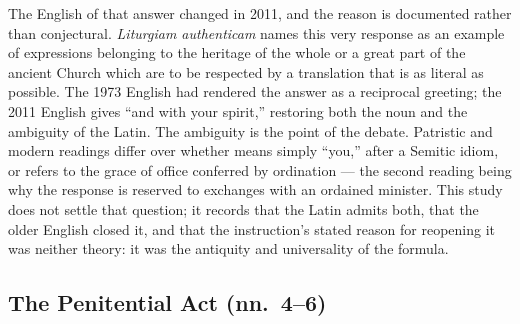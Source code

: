 The English of that answer changed in 2011, and the reason is documented rather than
conjectural. \emph{Liturgiam authenticam} names this very response as an example of expressions
belonging to the heritage of the whole or a great part of the ancient Church which are to be
respected by a translation that is as literal as possible. The 1973 English had rendered the answer as a reciprocal greeting; the 2011 English
gives ``and with your spirit,'' restoring both the noun and the ambiguity of the Latin. The
ambiguity is the point of the debate. Patristic and modern readings differ over whether
 means simply ``you,'' after a Semitic idiom, or refers to the grace of
office conferred by ordination --- the second reading being why the response is reserved to
exchanges with an ordained minister. This study does not settle that question; it records that
the Latin admits both, that the older English closed it, and that the instruction's stated
reason for reopening it was neither theory: it was the antiquity and universality of the
formula.

\subsection{The Penitential Act (nn.\ 4--6)}

